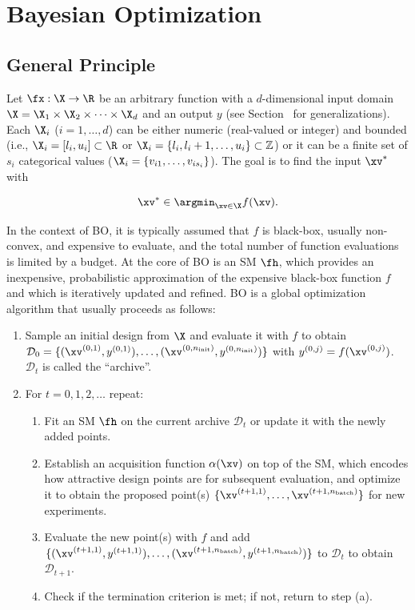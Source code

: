 \documentclass[12pt,letterpaper]{article}
\begin{document}
\section{Bayesian Optimization}

\label{sec:smbo}

\subsection*{General Principle}

Let $\fx: \X \to \R$ be an arbitrary function with a $d$-dimensional input domain $\X = \X_1 \times \X_2 \times \cdots \times \X_d$ and an output $y$ (see Section~ for generalizations).
Each $\X_i$ ($i=1,\ldots,d$) can be either numeric (real-valued or integer) and bounded (i.e., $\X_i = [l_i, u_i] \subset \R$ or $\X_i = \{l_i, l_i+1, \ldots, u_i\} \subset \mathbb{Z}$) or it can be a finite set of $s_i$ categorical values ($\X_i = \left\{ v_{i1}, \ldots, v_{is_i} \right\}$).
The goal is to find the input $\xv^\ast$ with

\begin{displaymath}
\xv^\ast \in \argmin_{\xv\in\X} f(\xv).
\end{displaymath}

In the context of BO, it is typically assumed that $f$ is black-box, usually non-convex, and expensive to evaluate, and the total number of function evaluations is limited by a budget.
At the core of BO is an SM $\fh$, which provides an inexpensive, probabilistic approximation of the expensive black-box function $f$ and which is iteratively updated and refined.
BO is a global optimization algorithm that usually proceeds as follows:

\begin{enumerate}
  \item Sample an initial design from $\X$ and evaluate it with $f$ to obtain\\
  $\mathcal{D}_0 = \{(\xv^{(0, 1)}, y^{(0, 1)}), \ldots, (\xv^{(0, n_\text{init})}, y^{(0, n_\text{init})})\}$ with $y^{(0, j)} = f(\xv^{(0, j)})$.
  $\mathcal{D}_t$ is called the ``archive''. 
  \item For $t = 0, 1, 2, \dots$ repeat:
    \begin{enumerate}
      \item Fit an SM $\fh$ on the current archive $\mathcal{D}_t$ or update it with the newly added points.
      \item Establish an acquisition function $\alpha(\xv)$ on top of the SM, which encodes how attractive design points are for subsequent evaluation, and optimize it to obtain the proposed point(s) $\{\xv^{(t+1, 1)}, \ldots, \xv^{(t+1, n_\text{batch})}\}$ for new experiments. 
      \item Evaluate the new point(s) with $f$ and add $\{(\xv^{(t+1, 1)}, y^{(t+1, 1)}), \ldots, (\xv^{(t+1, n_\text{batch})}, y^{(t+1, n_\text{batch})})\}$ to $\mathcal{D}_t$ to obtain $\mathcal{D}_{t+1}$.
      \item Check if the termination criterion is met; if not, return to step (a).
    \end{enumerate}
\end{enumerate}
\end{document}
